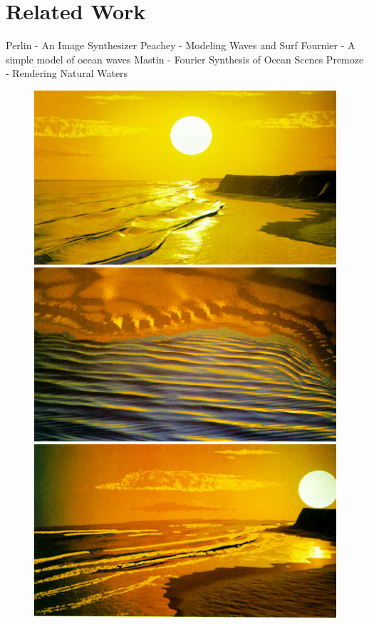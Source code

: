 \chapter{Related Work}
\label{ch:state_of_the_art}

Perlin - An Image Synthesizer \cite{Perlin:1985}
Peachey - Modeling Waves and Surf \cite{Peachey:1986}
Fournier - A simple model of ocean waves \cite{Fournier:1986}
Mastin - Fourier Synthesis of Ocean Scenes \cite{Mastin:1987}
Premoze - Rendering Natural Waters \cite{Premoze:2000}
\begin{figure}
 \centering
 \subtop
 {
  \includegraphics[scale=0.25]{figures/A_Simple_Model_of_Ocean_Waves_-_Fournier_1986-008.png}
 }
 \hfill
 \subtop
 {
  \includegraphics[scale=0.25]{figures/A_Simple_Model_of_Ocean_Waves_-_Fournier_1986-010.png}
 }
 \subtop
 {
  \includegraphics[scale=0.25]{figures/A_Simple_Model_of_Ocean_Waves_-_Fournier_1986-011.png}
}
\end{figure}
